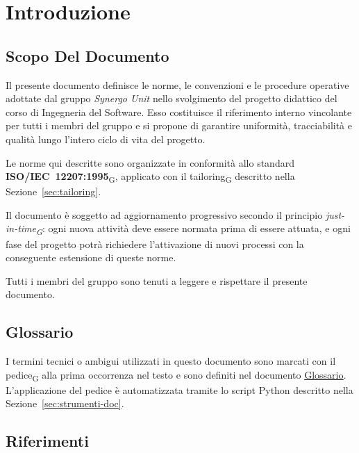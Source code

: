 \section{Introduzione}
 
\subsection{Scopo Del Documento}
 
Il presente documento definisce le norme, le convenzioni e le procedure operative
adottate dal gruppo \textit{Synergo Unit} nello svolgimento del progetto didattico
del corso di Ingegneria del Software. Esso costituisce il riferimento interno
vincolante per tutti i membri del gruppo e si propone di garantire uniformità,
tracciabilità e qualità lungo l'intero ciclo di vita del progetto.
 
Le norme qui descritte sono organizzate in conformità allo standard
\textbf{ISO/IEC~12207:1995}\textsubscript{G}, applicato con il tailoring\textsubscript{G} descritto nella
Sezione~\ref{sec:tailoring}. 

Il documento è soggetto ad aggiornamento progressivo
secondo il principio \textit{just-in-time\textsubscript{G}}: ogni nuova attività
deve essere normata prima di essere attuata, e ogni fase del progetto potrà
richiedere l'attivazione di nuovi processi con la conseguente estensione di queste
norme.
 
Tutti i membri del gruppo sono tenuti a leggere e rispettare il presente documento.
 
\subsection{Glossario}
 
I termini tecnici o ambigui utilizzati in questo documento sono marcati con il pedice\textsubscript{G} alla prima occorrenza nel testo e sono definiti nel
documento \href{https://synergo-unit-unipd.github.io/Second-Brain/docs/CC/doc_gestionali/doc_interni/glossario/glossario.pdf}
     {\underline{Glossario}}. L'applicazione del pedice è automatizzata tramite
lo script Python descritto nella Sezione~\ref{sec:strumenti-doc}.

\subsection{Riferimenti}
 
